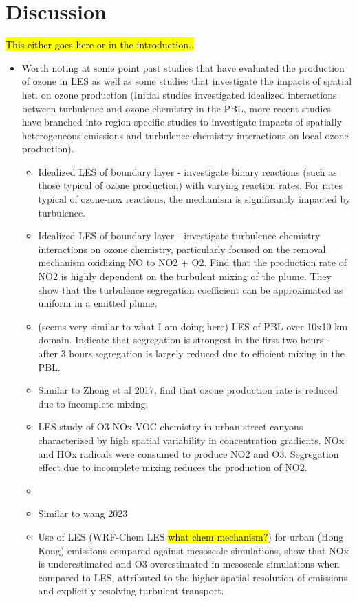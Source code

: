 \section{Discussion}

\hl{This either goes here or in the introduction..}
\begin{itemize}
\item Worth noting at some point past studies that have evaluated the production of ozone in LES as well as some studies that investigate the impacts of spatial het. on ozone production (Initial studies investigated idealized interactions between turbulence and ozone chemistry in the PBL, more recent studies have branched into region-specific studies to investigate impacts of spatially heterogeneous emissions and turbulence-chemistry interactions on local ozone production).
\begin{itemize}
\item \cite{schumann_large-eddy_1989} Idealized LES of boundary layer - investigate binary reactions (such as those typical of ozone production) with varying reaction rates. For rates typical of ozone-nox reactions, the mechanism is significantly impacted by turbulence.
\item \cite{sykes_large-eddy_1992} Idealized LES of boundary layer - investigate turbulence chemistry interactions on ozone chemistry, particularly focused on the removal mechanism oxidizing NO to NO2 + O2. Find that the production rate of NO2 is highly dependent on the turbulent mixing of the plume. They show that the turbulence segregation coefficient can be approximated as uniform in a emitted plume. 
\item \cite{auger_chemical_2007} (seems very similar to what I am doing here) LES of PBL over 10x10 km domain. Indicate that segregation is strongest in the first two hours - after 3 hours segregation is largely reduced due to efficient mixing in the PBL. 
\item \cite{zhong_modelling_2015} Similar to Zhong et al 2017, find that ozone production rate is reduced due to incomplete mixing.
\item \cite{zhong_large_2017} LES study of O3-NOx-VOC chemistry in urban street canyons characterized by high spatial variability in concentration gradients. NOx and HOx radicals were consumed to produce NO2 and O3. Segregation effect due to incomplete mixing reduces the production of NO2. 
\item \cite{wang_impact_2021}
\item \cite{wang_segregation_2022} Similar to wang 2023
\item \cite{wang_coupled_2023} Use of LES (WRF-Chem LES \hl{what chem mechanism?}) for urban (Hong Kong) emissions compared against mesoscale simulations, show that NOx is underestimated and O3 overestimated in mesoscale simulations when compared to LES, attributed to the higher spatial resolution of emissions and explicitly resolving turbulent transport.
\end{itemize} 
\end{itemize}




